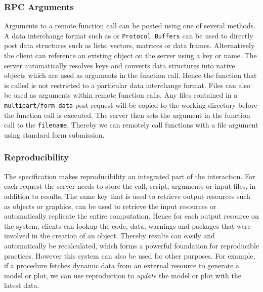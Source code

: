 \subsubsection{RPC Arguments}

Arguments to a remote function call can be posted using one of several methods. A data interchange format such as \JSON or \texttt{Protocol Buffers} can be used to directly post data structures such as lists, vectors, matrices or data frames. Alternatively the client can reference an existing object on the server using a key or name. The server automatically resolves keys and converts data structures into native objects which are used as arguments in the function call. Hence the function that is called is not restricted to a particular data interchange format. Files can also be used as arguments within remote function calls. Any files contained in a \texttt{multipart/form-data}  post request will be copied to the working directory before the function call is executed. The server then sets the argument in the function call to the \texttt{filename}. Thereby we can remotely call functions with a file argument using standard \HTML form submission.


\subsubsection{Reproducibility}

The \OpenCPU specification makes reproducibility an integrated part of the \API interaction. For each \RPC request the server needs to store the call, script, arguments or input files, in addition to results. The same key that is used to retrieve output resources such as objects or graphics, can be used to retrieve the input resources or automatically replicate the entire computation. Hence for each output resource on the system, clients can lookup the code, data, warnings and packages that were involved in the creation of an object. Thereby results can easily and automatically be recalculated, which forms a powerful foundation for reproducible practices. However this system can also be used for other purposes. For example, if a procedure fetches dynamic data from an external resource to generate a model or plot, we can use reproduction to \emph{update} the model or plot with the latest data.

